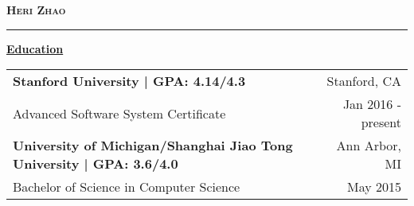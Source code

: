 \documentclass[12pt]{article}
\begin{document}
    \thispagestyle{empty}

    \noindent\begin{multicols}{3}
    \columnbreak
    \begin{center}\textsc{\textbf{\LARGE{Heri Zhao}}}\end{center}
    \columnbreak
    \end{multicols}\vspace{-0.9em}
    \hrule height 0.4pt
    
    \begin{center}\textrm{\textbf{\large{\underline{Education}}}}\end{center}
    \begin{tabularx}{\textwidth}{X r}
        \small{\textsf{\textbf{Stanford University | GPA: 4.14/4.3}}} & \small{\textsf{Stanford, CA}} \\
        \small{\textsf{Advanced Software System Certificate}} & \small{\textsf{Jan 2016 - present}} \\
        \small{\textsf{\textbf{University of Michigan/Shanghai Jiao Tong University | GPA: 3.6/4.0}}} & \small{\textsf{Ann Arbor, MI}} \\
        \small{\textsf{Bachelor of Science in Computer Science}} & \small{\textsf{May 2015}}
    \end{tabularx}
    
\end{document}
